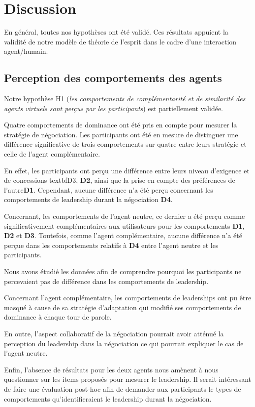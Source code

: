 	\section{Discussion}
	\label{sec:discussion}
	En général, toutes nos hypothèses ont été validé. Ces résultats appuient la validité de notre modèle de théorie de l'esprit dans le cadre d'une interaction agent/humain.   
	
	\subsection{Perception des comportements des agents}
	Notre hypothèse H1 (\textit{les comportements de complémentarité et de similarité des agents virtuels sont perçus par les participants}) est partiellement validée. 
	
	Quatre comportements de dominance ont été pris en compte pour mesurer la stratégie de négociation. 
	Les participants ont été en mesure de distinguer une différence significative de trois comportements sur quatre entre leurs stratégie et celle de l'agent complémentaire.
	
	En effet, les participants ont perçu une différence entre leurs niveau d'exigence et de concessions textbf{D3}, \textbf{D2}, ainsi que la prise en compte des préférences de l'autre\textbf{D1}. Cependant, aucune différence n'a été perçu concernant les comportements de leadership durant la négociation \textbf{D4}. 
	
	Concernant, les comportements de l'agent neutre, ce dernier a été perçu comme significativement complémentaires aux utilisateurs pour les comportements \textbf{D1}, \textbf{D2} et \textbf{D3}. 
	Toutefois, comme l'agent complémentaire, aucune différence n'a été perçue dans les comportements relatifs à \textbf{D4} entre l'agent neutre et les participants. 
	
	Nous avons étudié les données afin de comprendre pourquoi les participants ne percevaient pas de différence dans les comportements de leadership. 
	
	Concernant l'agent complémentaire, les comportements de leaderships ont pu être masqué à cause de  sa stratégie d'adaptation qui modifié ses comportements de dominance à chaque tour de parole.
	
	En outre, l'aspect collaboratif de la négociation pourrait avoir atténué la perception du leadership dans la négociation ce qui pourrait expliquer le cas de l'agent neutre. 
	
	Enfin, l'absence de résultats pour les deux agents nous amènent à nous questionner sur les items proposés pour mesurer le leadership. 
	Il serait intéressant de faire une évaluation post-hoc afin de demander aux participants le types de comportements qu'identifieraient le leadership durant la négociation.
	
